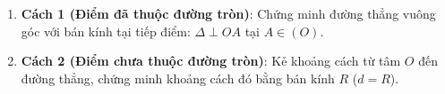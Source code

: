\begin{enumerate}
\item \textbf{Cách 1 (Điểm đã thuộc đường tròn)}: Chứng minh đường thẳng vuông góc với bán kính tại tiếp điểm: $\Delta \perp OA$ tại $A \in (O)$.
\item \textbf{Cách 2 (Điểm chưa thuộc đường tròn)}: Kẻ khoảng cách từ tâm $O$ đến đường thẳng, chứng minh khoảng cách đó bằng bán kính $R$ ($d = R$).
\end{enumerate}
